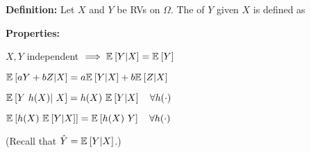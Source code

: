 \documentclass[12pt]{article}
\begin{document}
\textbf{Definition:} Let $X$ and $Y$ be RVs on $\Omega$. The  of $Y$ given $X$ is defined as


\textbf{Properties:}
\begin{compactitem}[$\rightarrow$]
	\item $X, Y$ independent $\implies \mathbb{E}_{}\left[Y | X\right] = \mathbb{E}_{}\left[Y\right]$
	
	\item $\mathbb{E}_{}\left[aY + bZ | X\right] =  a\mathbb{E}_{}\left[Y | X\right] + b \mathbb{E}_{}\left[Z | X\right] $
	
	\item $\mathbb{E}_{}\left[Y~ h(X) |~  X\right] = h(X) ~ \mathbb{E}_{}\left[Y|X\right] \quad \forall h(\cdot) $ 
	
	\item  $\mathbb{E}_{}\left[h(X) ~ \mathbb{E}_{}\left[Y|X\right]\right] = \mathbb{E}_{}\left[h(X)~Y\right] \quad \forall h(\cdot) $
	
	\item {} \purple{[26:00]}
\end{compactitem}
(Recall that $\hat Y = \mathbb{E}_{}\left[Y | X\right]$.)
\end{document}
